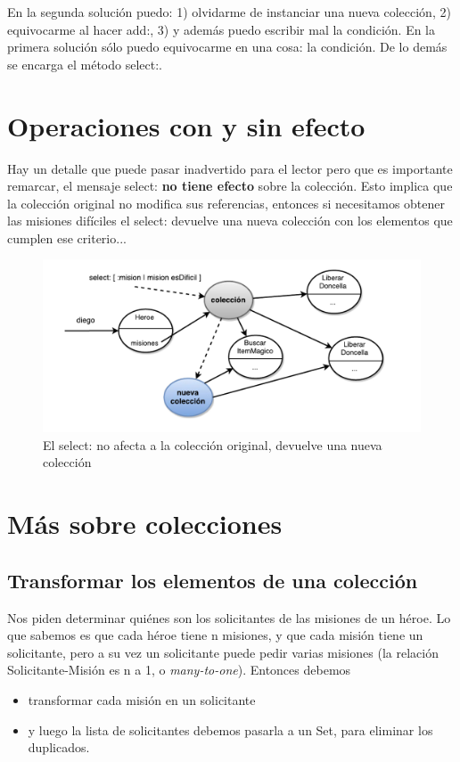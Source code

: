 \documentclass[a4paper,12pt]{book}
\begin{document}
\vspace{\baselineskip}
En la segunda solución puedo: 1) olvidarme de instanciar una nueva colección, 2) equivocarme al hacer add:, 3) y 
además puedo escribir mal la condición. En la primera solución sólo puedo equivocarme en una cosa: la condición.
De lo demás se encarga el método select:.

\section{Operaciones con y sin efecto}

Hay un detalle que puede pasar inadvertido para el lector pero que es importante remarcar, el mensaje select:
\textbf{no tiene efecto} sobre la colección. Esto implica que la colección original no modifica sus referencias,
entonces si necesitamos obtener las misiones difíciles el select: devuelve una nueva colección con los elementos
que cumplen ese criterio...

\begin{figure}[h!]
    \centering
    \includegraphics[width=1.1\textwidth]{images/20_select_sin_efecto.pdf}
    \caption{El select: no afecta a la colección original, devuelve una nueva colección}
\end{figure}


\section{Más sobre colecciones}

\subsection{Transformar los elementos de una colección}
Nos piden determinar quiénes son los solicitantes de las misiones de un héroe. Lo que sabemos es que cada
héroe tiene n misiones, y que cada misión tiene un solicitante, pero a su vez un solicitante puede pedir
varias misiones (la relación Solicitante-Misión es n a 1, o \textit{many-to-one}).
\newline
\newline
Entonces debemos
\begin{itemize}
 \item transformar cada misión en un solicitante
 \item y luego la lista de solicitantes debemos pasarla a un Set, para eliminar los duplicados.
\end{itemize}
\end{document}
